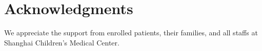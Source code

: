 \documentclass[fleqn,10pt,lineno]{wlpeerj} %
\begin{document}
\section*{Acknowledgments}
We appreciate the support from enrolled patients, their families, and all staffs at Shanghai Children’s Medical Center.










\end{document}
